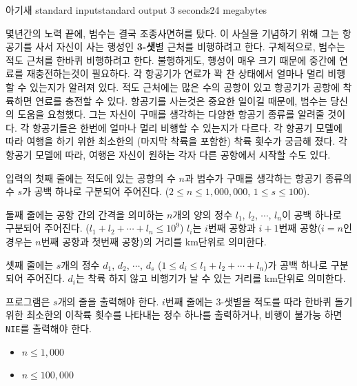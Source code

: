 \begin{problem}{아기새}
	{standard input}{standard output}
	{3 seconds}{24 megabytes}{}
	
	몇년간의 노력 끝에, 범수는 결국 조종사면허를 탔다. 이 사실을 기념하기 위해 그는 항공기를 사서 자신이 사는 행성인 \textbf{3-샛}별 근처를 비행하려고 한다. 구체적으로, 범수는 적도 근처를 한바퀴 비행하려고 한다. 불행하게도, 행성이 매우 크기 때문에 중간에 연료를 재충전하는것이 필요하다. 각 항공기가 연료가 꽉 찬 상태에서 얼마나 멀리 비행할 수 있는지가 알려져 있다. 적도 근처에는 많은 수의 공항이 있고 항공기가 공항에 착륙하면 연료를 충전할 수 있다. 항공기를 사는것은 중요한 일이길 때문에, 범수는 당신의 도움을 요청했다. 그는 자신이 구매를 생각하는 다양한 항공기 종류를 알려줄 것이다. 각 항공기들은 한번에 얼마나 멀리 비행할 수 있는지가 다르다. 각 항공기 모델에 따라 여행을 하기 위한 최소한의 (마지막 착륙을 포함한) 착륙 횟수가 궁금해 졌다. 각 항공기 모델에 따라, 여행은 자신이 원하는 각자 다른 공항에서 시작할 수도 있다.
	
	\InputFile
	
	입력의 첫째 줄에는 적도에 있는 공항의 수 $n$과 범수가 구매를 생각하는 항공기 종류의 수 $s$가 공백 하나로 구분되어 주어진다. ($2 \le n \le 1,000,000$, $1 \le s \le 100$).
	
	둘째 줄에는 공항 간의 간격을 의미하는 $n$개의 양의 정수 $l_1$, $l_2$, $\cdots$, $l_n$이 공백 하나로 구분되어 주어진다. ($l_1 + l_2 + \cdots + l_n \le 10^9$) $l_i$는 $i$번째 공항과 $i+1$번째 공항($i = n$인 경우는 $n$번째 공항과 첫번째 공항)의 거리를 km단위로 의미한다.
	
	셋째 줄에는 $s$개의 정수 $d_1$, $d_2$, $\cdots$, $d_s$ ($1 \le d_i \le l_1 + l_2 + \cdots + l_n$)가 공백 하나로 구분되어 주어진다. $d_i$는 착륙 하지 않고 비행기가 날 수 있는 거리를 km단위로 의미한다.
	
	
	
	\OutputFile
	
	프로그램은 $s$개의 줄을 출력해야 한다. $i$번째 줄에는 3-샛별을 적도를 따라 한바퀴 돌기 위한 최소한의 이착륙 횟수를 나타내는 정수 하나를 출력하거나, 비행이 불가능 하면 \texttt{NIE}를 출력해야 한다.
	
	\begin{itemize}
		\item $n \le 1,000$
	\end{itemize}
	
	\begin{itemize}
		\item $n \le 100,000$
	\end{itemize}
	

\end{problem}
